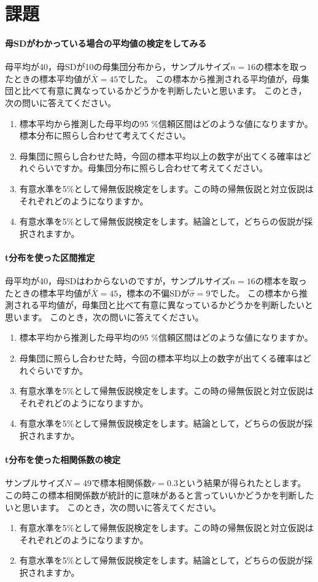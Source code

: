 \documentclass{ltjsbook}
\begin{document}
\section{課題}
\paragraph{母SDがわかっている場合の平均値の検定をしてみる}
母平均が40，母SDが10の母集団分布から，サンプルサイズ$n=16$の標本を取ったときの標本平均値が$\bar{X}=45$でした。
この標本から推測される平均値が，母集団と比べて有意に異なっているかどうかを判断したいと思います。
このとき，次の問いに答えてください。
\begin{enumerate}
    \item 標本平均から推測した母平均の95 \%信頼区間はどのような値になりますか。標本分布に照らし合わせて考えてください。
    \item 母集団に照らし合わせた時，今回の標本平均以上の数字が出てくる確率はどれぐらいですか。母集団分布に照らし合わせて考えてください。
    \item 有意水準を5\%として帰無仮説検定をします。この時の帰無仮説と対立仮説はそれぞれどのようになりますか。
    \item 有意水準を5\%として帰無仮説検定をします。結論として，どちらの仮説が採択されますか。
\end{enumerate}

\paragraph{t分布を使った区間推定}
母平均が40，母SDはわからないのですが，サンプルサイズ$n=16$の標本を取ったときの標本平均値が$\bar{X}=45$，標本の不偏SDが$\hat{\sigma}=9$でした。
この標本から推測される平均値が，母集団と比べて有意に異なっているかどうかを判断したいと思います。
このとき，次の問いに答えてください。
\begin{enumerate}
    \item 標本平均から推測した母平均の95 \%信頼区間はどのような値になりますか。
    \item 母集団に照らし合わせた時，今回の標本平均以上の数字が出てくる確率はどれぐらいですか。
    \item 有意水準を5\%として帰無仮説検定をします。この時の帰無仮説と対立仮説はそれぞれどのようになりますか。
    \item 有意水準を5\%として帰無仮説検定をします。結論として，どちらの仮説が採択されますか。
\end{enumerate}

\paragraph{t分布を使った相関係数の検定}
サンプルサイズ$N=49$で標本相関係数$r = 0.3$という結果が得られたとします。この時この標本相関係数が統計的に意味があると言っていいかどうかを判断したいと思います。
このとき，次の問いに答えてください。
\begin{enumerate}
    \item 有意水準を5\%として帰無仮説検定をします。この時の帰無仮説と対立仮説はそれぞれどのようになりますか。
    \item 有意水準を5\%として帰無仮説検定をします。結論として，どちらの仮説が採択されますか。
\end{enumerate}
\end{document}
